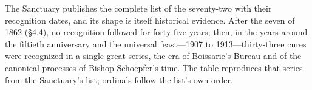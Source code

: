 The Sanctuary publishes the complete list of the seventy-two with
their recognition dates, and its shape is itself historical
evidence. After the seven of 1862 (\S4.4), no recognition
followed for forty-five years; then, in the years around the
fiftieth anniversary and the universal feast---1907 to
1913---thirty-three cures were recognized in a single great
series, the era of Boissarie's Bureau and of the canonical
processes of Bishop Schoepfer's time. The table reproduces that
series from the Sanctuary's list; ordinals follow the list's own
order.

